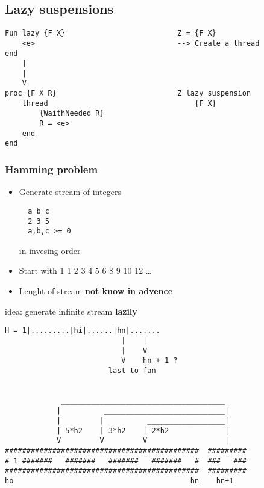 \documentclass[]{article}
\begin{document}
\hypertarget{lazy-suspensions}{%
\subsection{Lazy suspensions}\label{lazy-suspensions}}

\begin{verbatim}
Fun lazy {F X}                          Z = {F X}
    <e>                                 --> Create a thread
end
    |
    |                                   
    V
proc {F X R}                            Z lazy suspension
    thread                                  {F X}
        {WaithNeeded R}
        R = <e>
    end
end
\end{verbatim}

\hypertarget{hamming-problem}{%
\subsubsection{Hamming problem}\label{hamming-problem}}

\begin{itemize}
\item
  Generate stream of integers

\begin{verbatim}
  a b c
  2 3 5
  a,b,c >= 0
\end{verbatim}

  in invesing order
\item
  Start with 1 1 2 3 4 5 6 8 9 10 12 \ldots{}
\item
  Lenght of stream \textbf{not know in advence}
\end{itemize}

idea: generate infinite stream \textbf{lazily}

\begin{verbatim}
H = 1|.........|hi|......|hn|.......
                           |    |
                           |    V
                           V    hn + 1 ?
                        last to fan


             ______________________________________
            |          ____________________________|
            |         |          __________________|
            | 5*h2    | 3*h2    | 2*h2             |
            V         V         V                  |
#############################################  #########
# 1 #######   #######   #######   #######   #  ###   ###
#############################################  #########
ho                                         hn    hn+1
\end{verbatim}
\end{document}
